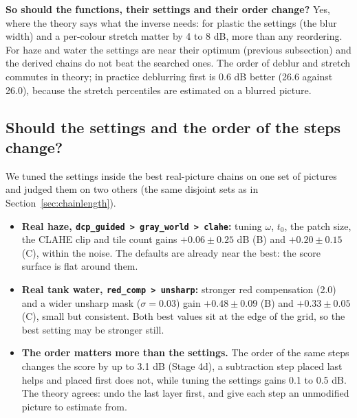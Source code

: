 \documentclass[10pt,a4paper]{article}
\newcommand{\tablein}[1]{}
\newcommand{\REAL}{\textcolor{teal!80!black}{\textbf{[REAL]}}}
\begin{document}
\textbf{So should the functions, their settings and their order change?} Yes, where the theory says what the inverse needs: for plastic the settings (the blur width) and a per-colour stretch matter by 4 to 8 dB, more than any reordering. For haze and water the settings are near their optimum (previous subsection) and the derived chains do not beat the searched ones. The order of deblur and stretch commutes in theory; in practice deblurring first is 0.6 dB better (26.6 against 26.0), because the stretch percentiles are estimated on a blurred picture.

\subsection{Should the settings and the order of the steps change?}
We tuned the settings inside the best real-picture chains on one set of pictures and judged them on two others (the same disjoint sets as in Section~\ref{sec:chainlength}).
\begin{table}[H]\centering\scriptsize\tablein{tune_chain}\caption{\REAL\ Default against tuned settings of the best chains (A chose the settings; B and C are held out). Gain: mean $\pm$ standard error, dB.}\end{table}
\begin{itemize}
\item \textbf{Real haze, \texttt{dcp\_guided > gray\_world > clahe}:} tuning $\omega$, $t_0$, the patch size, the CLAHE clip and tile count gains $+0.06\pm0.25$ dB (B) and $+0.20\pm0.15$ (C), within the noise. The defaults are already near the best: the score surface is flat around them.
\item \textbf{Real tank water, \texttt{red\_comp > unsharp}:} stronger red compensation (2.0) and a wider unsharp mask ($\sigma=0.03$) gain $+0.48\pm0.09$ (B) and $+0.33\pm0.05$ (C), small but consistent. Both best values sit at the edge of the grid, so the best setting may be stronger still.
\item \textbf{The order matters more than the settings.} The order of the same steps changes the score by up to 3.1 dB (Stage 4d), a subtraction step placed last helps and placed first does not, while tuning the settings gains 0.1 to 0.5 dB. The theory agrees: undo the last layer first, and give each step an unmodified picture to estimate from.
\end{itemize}
\end{document}
